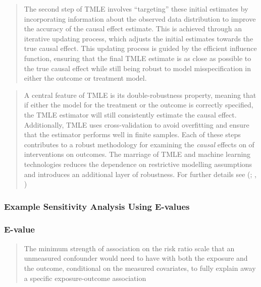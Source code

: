 \documentclass[
  singlecolumn]{article}
\begin{document}
\begin{quote}
The second step of TMLE involves ``targeting'' these initial estimates
by incorporating information about the observed data distribution to
improve the accuracy of the causal effect estimate. This is achieved
through an iterative updating process, which adjusts the initial
estimates towards the true causal effect. This updating process is
guided by the efficient influence function, ensuring that the final TMLE
estimate is as close as possible to the true causal effect while still
being robust to model misspecification in either the outcome or
treatment model.
\end{quote}

\begin{quote}
A central feature of TMLE is its double-robustness property, meaning
that if either the model for the treatment or the outcome is correctly
specified, the TMLE estimator will still consistently estimate the
causal effect. Additionally, TMLE uses cross-validation to avoid
overfitting and ensure that the estimator performs well in finite
samples. Each of these steps contributes to a robust methodology for
examining the \emph{causal} effects on of interventions on outcomes. The
marriage of TMLE and machine learning technologies reduces the
dependence on restrictive modelling assumptions and introduces an
additional layer of robustness. For further details see
(;
,
)
\end{quote}

\subsubsection{Example Sensitivity Analysis Using
E-values}\label{example-sensitivity-analysis-using-e-values}

\subsubsection{E-value}\label{e-value}

\begin{quote}
The minimum strength of association on the risk ratio scale that an
unmeasured confounder would need to have with both the exposure and the
outcome, conditional on the measured covariates, to fully explain away a
specific exposure-outcome association
\end{quote}
\end{document}
